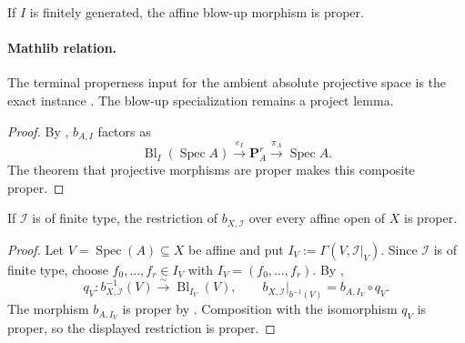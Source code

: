 \begin{lemma}
  \label{lemma:nagata-affine-blowup-proper}

  If \(I\) is finitely generated, the affine blow-up morphism is proper.

  \paragraph{Mathlib relation.}
  The terminal properness input for the ambient absolute projective space is
  the exact instance
  \texttt{}.
  The blow-up specialization remains a project lemma.
\end{lemma}

\begin{proof}
  By , $b_{A,I}$ factors as
  \[
    \operatorname{Bl}_I(\operatorname{Spec}A)
      \xrightarrow{e_I}\mathbf P_A^r
      \xrightarrow{\pi_A}\operatorname{Spec}A.
  \]
  The theorem that projective morphisms are proper makes this composite
  proper.
\end{proof}

\begin{lemma}
  \label{lemma:nagata-global-blowup-proper-local}

  If $\mathcal I$ is of finite type, the restriction of
  $b_{X,\mathcal I}$ over every affine open of $X$ is proper.
\end{lemma}

\begin{proof}
  Let $V=\operatorname{Spec}(A)\subseteq X$ be affine and put
  $I_V:=\Gamma(V,\mathcal I|_V)$.  Since $\mathcal I$ is of finite type,
  choose $f_0,\ldots,f_r\in I_V$ with $I_V=(f_0,\ldots,f_r)$.  By
  ,
  \[
    q_V\colon b_{X,\mathcal I}^{-1}(V)
      \xrightarrow{\sim}\operatorname{Bl}_{I_V}(V),
    \qquad
    b_{X,\mathcal I}|_{b^{-1}(V)}
      =b_{A,I_V}\circ q_V.
  \]
  The morphism $b_{A,I_V}$ is proper by
  .  Composition with the isomorphism
  $q_V$ is proper, so the displayed restriction is proper.
\end{proof}

